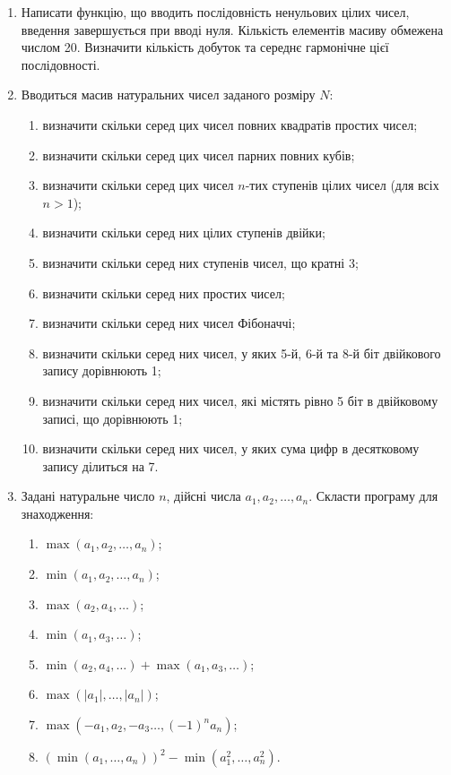 \documentclass[a5paper,titlepage,openany,twoside,draft]{book_unv}%
\makeatletter
\newcommand{\xslalph}[1]{\expandafter\@xslalph\csname c@#1\endcsname}
\newcommand{\@xslalph}[1]{%
    \ifcase#1\or а\or б\or в\or г\or д\or e\or є\or ж\or з\or i%
    \or й\or к\or л\or м\or н\or о\or п\or р\or с\or т%
    \or у\or ф\or х\or ц\or ч\or ш\or ю\or я\or аа\or бб\or вв%
    \else\@ctrerr\fi%
}
\makeatother
\begin{document}
\begin{enumerate}
\def\labelenumi{\arabic{enumi})}
\setcounter{enumi}{6}
\item
  Написати функцію, що вводить послідовність ненульових цілих чисел,
  введення завершується при вводі нуля. Кількість елементів масиву
  обмежена числом 20. Визначити кількість добуток та середнє гармонічне
  цієї послідовності.
\item
  Вводиться масив натуральних чисел заданого розміру $N$:
\begin{enumerate}[label=\xslalph*)]
\item визначити скільки серед цих чисел повних квадратів простих чисел;
\item визначити скільки серед цих чисел парних повних кубів;
\item визначити скільки серед цих чисел $n$-тих ступенів цілих чисел (для
всіх $n>1$);
\item визначити скільки серед них цілих ступенів двійки;
\item визначити скільки серед них ступенів чисел, що кратні 3;
\item визначити скільки серед них простих чисел;
\item визначити скільки серед них чисел Фібоначчі;
\item визначити скільки серед них чисел, у яких 5-й, 6-й та 8-й біт
двійкового запису дорівнюють 1;
\item визначити скільки серед них чисел, які містять рівно 5 біт в
двійковому записі, що дорівнюють 1;
\item визначити скільки серед них чисел, у яких сума цифр в десятковому
запису ділиться на 7.
 \end{enumerate}

\item Задані натуральне число \(n\), дійсні числа
\(a_{1},a_{2},\ldots,a_{n}\). Скласти програму для знаходження:
\begin{enumerate}[label=\xslalph*)]
\item
 \(\max\left( a_{1},a_{2},\ldots,a_{n} \right)\); 
\item
\(\min\left( a_{1},a_{2},\ldots,a_{n} \right)\);
\item \(\max\left( a_{2},a_{4},\ldots \right)\); 
\item
\(\min\left( a_{1},a_{3},\ldots \right)\);
\item
\(\min\left( a_{2},a_{4},\ldots \right) + \max\left( a_{1},a_{3},\ldots \right)\);
\item
\(\max\left( \left| a_{1} \right|,\ldots,\left| a_{n} \right| \right)\);
\item \(\max\left( -a_{1},a_{2}, -a_{3}\ldots,(-1)^{n}a_{n} \right)\);
\item
\(\left( \min\left( a_{1},\ldots,a_{n} \right) \right)^{2} - \min\left( a_{1}^{2},\ldots,a_{n}^{2} \right)\).


\end{enumerate}
\end{enumerate}
\end{document}
